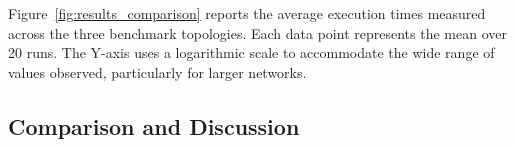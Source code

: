Figure~\ref{fig:results_comparison} reports the average execution times measured across the three benchmark topologies. Each data point represents the mean over 20 runs. The Y-axis uses a logarithmic scale to accommodate the wide range of values observed, particularly for larger networks.


\subsection{Comparison and Discussion}
